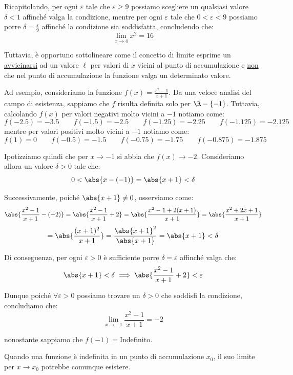 \documentclass[a4paper, 12pt]{report}
\begin{document}
    Ricapitolando, per ogni $\varepsilon$ tale che $\varepsilon \geq 9$ possiamo scegliere un qualsiasi valore $\delta < 1$ affinché valga la condizione, mentre per ogni $\varepsilon$ tale che $0 < \varepsilon < 9$ possiamo porre $\delta = \frac{\varepsilon}{9}$ affinché la condizione sia soddisfatta, concludendo che:
    \[\lim_{x \to 4} x^2 = 16\]

    Tuttavia, è opportuno sottolineare come il concetto di limite esprime un \underline{avvicinarsi} ad un valore $\ell$ per valori di $x$ vicini al punto di accumulazione e \underline{non} che nel punto di accumulazione la funzione valga un determinato valore.

    Ad esempio, consideriamo la funzione $f(x) = \frac{x^2-1}{x+1}$. Da una veloce analisi del campo di esistenza, sappiamo che $f$ risulta definita solo per $\R - \{-1\}$. Tuttavia, calcolando $f(x)$ per valori negativi molto vicini a $-1$ notiamo come:
    \[f(-2.5) = -3.5 \qquad f(-1.5) = -2.5 \qquad f(-1.25) = -2.25 \qquad f(-1.125) = -2.125\]
    mentre per valori positivi molto vicini a $-1$ notiamo come:
    \[f(1) = 0 \qquad f(-0.5) = -1.5 \qquad f(-0.75) = -1.75 \qquad f(-0.875) = -1.875\] 

    Ipotizziamo quindi che per $x \to -1$ si abbia che $f(x) \to -2$. Consideriamo allora un valore $\delta > 0$ tale che:
    \[0 < \abs{x-(-1)} = \abs{x+1} < \delta\]

    Successivamente, poiché $\abs{x+1} \neq 0$, osserviamo come:
    \[\abs{\frac{x^2-1}{x+1} - (-2)} = \abs{\frac{x^2-1}{x+1} + 2} = \abs{\frac{x^2-1+2(x+1)}{x+1}} = \abs{\frac{x^2+2x+1}{x+1}}\]
    \[= \abs{\frac{(x+1)^2}{x+1}} = \frac{\abs{x+1}^2}{\abs{x+1}} = \abs{x+1} < \delta\]
    
    Di conseguenza, per ogni $\varepsilon > 0$ è sufficiente porre $\delta = \varepsilon$ affinché valga che:
    \[\abs{x+1} < \delta \implies \abs{\frac{x^2-1}{x+1} + 2} < \varepsilon\]
    
    Dunque poiché $\forall \varepsilon > 0$ possiamo trovare un $\delta > 0$ che soddisfi la condizione, concludiamo che:
    \[\lim_{x \to -1} \frac{x^2-1}{x+1} = -2\]

    nonostante sappiamo che $f(-1) = \mathrm{Indefinito}$.

    \begin{framedobs}{}
        Quando una funzione è indefinita in un punto di accumulazione $x_0$, il suo limite per $x \to x_0$ potrebbe comunque esistere.
    \end{framedobs}
\end{document}
